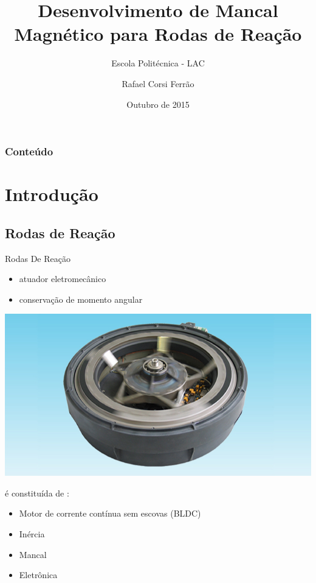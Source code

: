 \documentclass{beamer}
\title{Desenvolvimento de Mancal Magnético  para Rodas de Reação}
\subtitle{Escola Politécnica - LAC}
\author{Rafael Corsi Ferrão}
\date{Outubro de 2015}
\institute{\url{corsiferrao@gmail.com} \\\url{http://www.maua.br}}
\begin{document}
\begin{frame}[plain,t]
	\titlepage
\end{frame}

\begin{frame}
	\frametitle{Conteúdo}
		\tableofcontents
\end{frame}

\section{Introdução}

\subsection{Rodas de Reação}
\begin{frame}{Rodas De Reação}

	\begin{itemize}
		\item atuador eletromecânico
		\item conservação de momento angular
	\end{itemize}
	
	\begin{center}
	\includegraphics[width=0.5\linewidth]{MWI.jpg}
	\end{center}
	
	é constituída de :
	
	\begin{itemize}
		\item Motor de corrente contínua sem escovas (BLDC)
		\item Inércia
		\item Mancal
		\item Eletrônica
	\end{itemize}
\end{frame}
\end{document}
